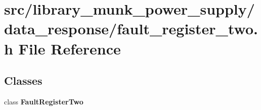 \section{src/library\+\_\+munk\+\_\+power\+\_\+supply/data\+\_\+response/fault\+\_\+register\+\_\+two.h File Reference}
\label{fault__register__two_8h}
\subsection*{Classes}
\begin{DoxyCompactItemize}
\item 
class \textbf{ Fault\+Register\+Two}
\end{DoxyCompactItemize}
